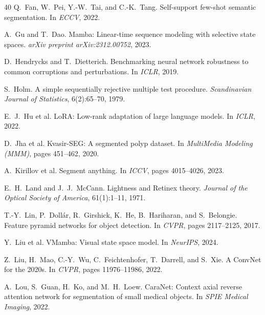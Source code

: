 \documentclass[10pt,twocolumn]{article}
\begin{document}
\begin{thebibliography}{40}
Q.~Fan, W.~Pei, Y.-W.~Tai, and C.-K.~Tang.
\newblock Self-support few-shot semantic segmentation.
\newblock In \emph{ECCV}, 2022.

A.~Gu and T.~Dao.
\newblock Mamba: Linear-time sequence modeling with selective state spaces.
\newblock \emph{arXiv preprint arXiv:2312.00752}, 2023.

D.~Hendrycks and T.~Dietterich.
\newblock Benchmarking neural network robustness to common corruptions and perturbations.
\newblock In \emph{ICLR}, 2019.

S.~Holm.
\newblock A simple sequentially rejective multiple test procedure.
\newblock \emph{Scandinavian Journal of Statistics}, 6(2):65--70, 1979.

E.~J.~Hu et al.
\newblock LoRA: Low-rank adaptation of large language models.
\newblock In \emph{ICLR}, 2022.

D.~Jha et al.
\newblock Kvasir-SEG: A segmented polyp dataset.
\newblock In \emph{MultiMedia Modeling (MMM)}, pages 451--462, 2020.

A.~Kirillov et al.
\newblock Segment anything.
\newblock In \emph{ICCV}, pages 4015--4026, 2023.

E.~H.~Land and J.~J.~McCann.
\newblock Lightness and Retinex theory.
\newblock \emph{Journal of the Optical Society of America}, 61(1):1--11, 1971.

T.-Y.~Lin, P.~Doll{\'a}r, R.~Girshick, K.~He, B.~Hariharan, and S.~Belongie.
\newblock Feature pyramid networks for object detection.
\newblock In \emph{CVPR}, pages 2117--2125, 2017.

Y.~Liu et al.
\newblock VMamba: Visual state space model.
\newblock In \emph{NeurIPS}, 2024.

Z.~Liu, H.~Mao, C.-Y.~Wu, C.~Feichtenhofer, T.~Darrell, and S.~Xie.
\newblock A ConvNet for the 2020s.
\newblock In \emph{CVPR}, pages 11976--11986, 2022.

A.~Lou, S.~Guan, H.~Ko, and M.~H.~Loew.
\newblock CaraNet: Context axial reverse attention network for segmentation of small medical objects.
\newblock In \emph{SPIE Medical Imaging}, 2022.


\end{thebibliography}
\end{document}
